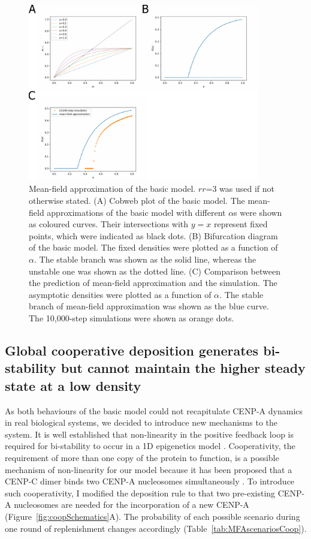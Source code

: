 \begin{figure}[htbp]
  \centering
  \includegraphics[width=0.9\textwidth]{chapter2/figures/mean-field_approximation.pdf}
  \caption[Mean-field approximation of the basic model]{Mean-field approximation of the basic model. $rr$=3 was used if not otherwise stated. (A) Cobweb plot of the basic model. The mean-field approximations of the basic model with different $\alpha$s were shown as coloured curves. Their intersections with $y = x$ represent fixed points, which were indicated as black dots. (B) Bifurcation diagram of the basic model. The fixed densities were plotted as a function of $\alpha$. The stable branch was shown as the solid line, whereas the unstable one was shown as the dotted line. (C) Comparison between the prediction of mean-field approximation and the simulation. The asymptotic densities were plotted as a function of $\alpha$. The stable branch of mean-field approximation was shown as the blue curve. The 10,000-step simulations were shown as orange dots.}
  \label{fig:meanFieldApproximation}
\end{figure}

\subsection{Global cooperative deposition generates bi-stability but cannot maintain the higher steady state at a low density}

As both behaviours of the basic model could not recapitulate CENP-A dynamics in real biological systems, we decided to introduce new mechanisms to the system. It is well established that non-linearity in the positive feedback loop is required for bi-stability to occur in a 1D epigenetics model \citep{Dodd2007, Micheelsen2010TheoryLandscapes, Dodd2017}. Cooperativity, the requirement of more than one copy of the protein to function, is a possible mechanism of non-linearity for our model because it has been proposed that a CENP-C dimer binds two CENP-A nucleosomes simultaneously \citep{Walstein2021}. To introduce such cooperativity, I modified the deposition rule to that two pre-existing CENP-A nucleosomes are needed for the incorporation of a new CENP-A (Figure~\ref{fig:coopSchematics}A). The probability of each possible scenario during one round of replenishment changes accordingly (Table~\ref{tab:MFAscenariosCoop}). 


